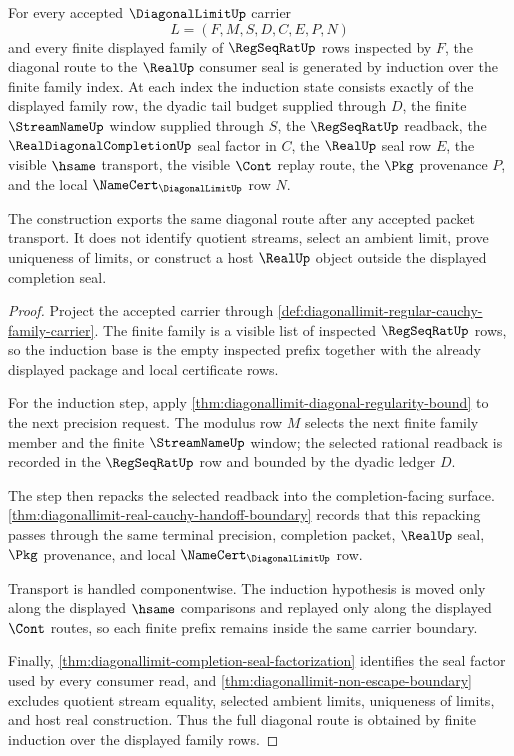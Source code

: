 \begin{theorem}
\label{thm:diagonal-limit-finite-family-induction}
For every accepted $\DiagonalLimitUp$ carrier
$$
L=(F,M,S,D,C,E,P,N)
$$
and every finite displayed family of $\RegSeqRatUp$ rows inspected by $F$, the diagonal route to the $\RealUp$ consumer seal is generated by induction over the finite family index. At each index the induction state consists exactly of the displayed family row, the dyadic tail budget supplied through $D$, the finite $\StreamNameUp$ window supplied through $S$, the $\RegSeqRatUp$ readback, the $\RealDiagonalCompletionUp$ seal factor in $C$, the $\RealUp$ seal row $E$, the visible $\hsame$ transport, the visible $\Cont$ replay route, the $\Pkg$ provenance $P$, and the local $\NameCert_{\DiagonalLimitUp}$ row $N$.

The construction exports the same diagonal route after any accepted packet transport. It does not identify quotient streams, select an ambient limit, prove uniqueness of limits, or construct a host $\RealUp$ object outside the displayed completion seal.
\end{theorem}
\begin{proof}
Project the accepted carrier through \autoref{def:diagonallimit-regular-cauchy-family-carrier}. The finite family is a visible list of inspected $\RegSeqRatUp$ rows, so the induction base is the empty inspected prefix together with the already displayed package and local certificate rows.

For the induction step, apply \autoref{thm:diagonallimit-diagonal-regularity-bound} to the next precision request. The modulus row $M$ selects the next finite family member and the finite $\StreamNameUp$ window; the selected rational readback is recorded in the $\RegSeqRatUp$ row and bounded by the dyadic ledger $D$.

The step then repacks the selected readback into the completion-facing surface. \autoref{thm:diagonallimit-real-cauchy-handoff-boundary} records that this repacking passes through the same terminal precision, completion packet, $\RealUp$ seal, $\Pkg$ provenance, and local $\NameCert_{\DiagonalLimitUp}$ row.

Transport is handled componentwise. The induction hypothesis is moved only along the displayed $\hsame$ comparisons and replayed only along the displayed $\Cont$ routes, so each finite prefix remains inside the same carrier boundary.

Finally, \autoref{thm:diagonallimit-completion-seal-factorization} identifies the seal factor used by every consumer read, and \autoref{thm:diagonallimit-non-escape-boundary} excludes quotient stream equality, selected ambient limits, uniqueness of limits, and host real construction. Thus the full diagonal route is obtained by finite induction over the displayed family rows.
\end{proof}

